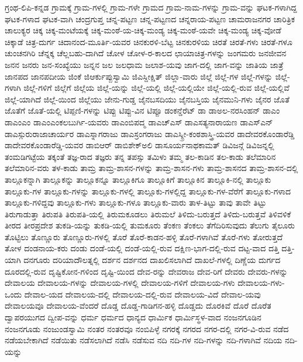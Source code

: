 {ಗ್ರಂಥ-ಲಿಪಿ-ಕನ್ನಡ
ಗ್ರಾಮಕ್ಕೆ
ಗ್ರಾಮ-ಗಳಲ್ಲಿ
ಗ್ರಾಮ-ಗಳೇ
ಗ್ರಾಮದ
ಗ್ರಾಮ-ನಾಮ-ಗಳನ್ನು
ಗ್ರಾಮ-ವನ್ನು
ಘಟಕ-ಗಳಾಗಿದ್ದ
ಘಟಕ-ಗಳಾದ
ಘಟಕ-ವಾಗಿ
ಚಂದ್ರಗುಪ್ತ
ಚನ್ನ-ಪಟ್ಟಣ
ಚನ್ನ-ಪಟ್ಟಣದ
ಚನ್ನರಾಯ-ಪಟ್ಟಣ
ಚಾಮರಾಜನಗರ
ಚಾರಿತ್ರಿಕ
ಚಾಲುಕ್ಯರ
ಚಿಕ್ಕ
ಚಿಕ್ಕ-ಮಂಟೆಯಕ್ಕೆ
ಚಿಕ್ಕ-ಮಂಠೆ-ಯ-ಚಿಕ್ಕ-ಮಂಡ್ಯ
ಚಿಕ್ಕ-ಮಂಠೆ-ಯವೇ
ಚಿಕ್ಕ-ಮಂಡ್ಯ
ಚಿಕ್ಕ-ವೋಡೆ
ಚಿಕ್ಕಾಡೆ
ಚಿತ್ರ-ದುರ್ಗ
ಚಿದಾನಂದ-ಮೂರ್ತಿ-ಯವರ
ಚಿನಕುರಳಿ-ಬೆಟ್ಟ
ಚಿನಕುರಳಿಯ
ಚಿರತೆ
ಚಿರತೆ-ಗಳು
ಚಿರತೆ-ಗಳೂ
ಚುಂಚನಗಿರಿ
ಚೆನ್ನಕ್ಕ
ಚೆಲ್ಲಬಹು-ದಾಗಿದೆ
ಚೋಳ
ಚೋಳ-ರ-ಕಾಲದ
ಛಾಯಾಚಿತ್ರ-ಗಳನ್ನು
ಜಂಗಮರು
ಜನಜೀವನ
ಜನನ
ಜನರು
ಜನ-ಸಂಖ್ಯೆಯು
ಜನ್ನನ
ಜಲ
ಜಲಧಾಮ
ಜಲಾಶ-ಯವು
ಜಾಗ-ದಲ್ಲಿ
ಜಾಗ-ವನ್ನು
ಜಾತಿಯ
ಜಾತ್ರೆ
ಜಾನಪದ
ಜಾನಪದೀಯ
ಜಿಂಕೆ
ಜಿಆರ್ಕುಪ್ಪುಸ್ವಾಮಿ
ಜಿಎಸ್ದೀಕ್ಷಿತ್
ಜಿಲ್ಲಾ-ವಾರು
ಜಿಲ್ಲೆ
ಜಿಲ್ಲೆ-ಗಳ
ಜಿಲ್ಲೆ-ಗಳನ್ನು
ಜಿಲ್ಲೆ-ಗಳಾಗಿ
ಜಿಲ್ಲೆ-ಗಳಿಗೆ
ಜಿಲ್ಲೆಗೆ
ಜಿಲ್ಲೆಯ
ಜಿಲ್ಲೆ-ಯನ್ನು
ಜಿಲ್ಲೆ-ಯಲ್ಲಿ
ಜಿಲ್ಲೆ-ಯಲ್ಲಿಯೇ
ಜಿಲ್ಲೆ-ಯಲ್ಲಿ-ರುವ
ಜಿಲ್ಲೆ-ಯಲ್ಲಿವೆ
ಜಿಲ್ಲೆ-ಯಾಗಿದೆ
ಜಿಲ್ಲೆ-ಯಿಂದ
ಜಿಲ್ಲೆಯು
ಜೇನು-ಗುಡ್ಡ
ಜೈನಬಸದಿಯು
ಜೈನಬಸ್ತಿಯ
ಜೈನಮುನಿ-ಗಳು
ಜೈನರ
ಜೊತೆ
ಜೊತೆಗೆ
ಜೊತೆ-ಯಲ್ಲಿ
ಟಿಪ್ಪಣಿ-ಗಳನ್ನು
ಟಿಪ್ಪು
ಟಿಪ್ಪು-ವಿನ
ಟಿಪ್ಪೂ
ಡಂಕನ್ಡೆರೆಟ್
ಡಾ
ಡಾಅಲ-ನರಸಿಂಹನ್
ಡಾಎಂ
ಡಾಎಂಎಂ
ಡಾಎಂಎಂಕಲಬುರ್ಗಿ-ಯವರು
ಡಾಎಂಬಿಪದ್ಮ
ಡಾಎಚ್ಎಸ್
ಡಾಎಸತ್ಯನಾರಾಯಣ
ಡಾಎಸ್ಎನ್
ಡಾಎಸ್ಗುರುರಾಜಾಚಾರ್ಯರ
ಡಾಎಸ್ನಾಗರಾಜು
ಡಾಎಸ್ರಂಗರಾಜು
ಡಾಎಸ್ಶ್ರೀ-ಕಂಠಶಾಸ್ತ್ರಿ-ಯವರ
ಡಾದೇವರಕೊಂಡಾರೆಡ್ಡಿ
ಡಾದೇವರಕೊಂಡಾರೆಡ್ಡಿ-ಯವರ
ಡಾಬಿಆರ್
ಡಾಬಿಶೇಕ್ಅಲಿ
ಡಾಸೂರ್ಯನಾಥಕಾಮತ್
ಡಿವಿಜನ್ಗೆ
ಡಿವಿಜನ್ನಲ್ಲಿ
ತಂಮಡಿಗಟ್ಟೆಯ
ತಕ್ಕಂತೆ
ತಜ್ಞ-ರಾದ
ತಜ್ಞರು
ತನ್ನ
ತಪಸ್ಸು
ತಮಿಳು
ತಮ್ಮ
ತಲ-ಕಾಡಿನ
ತಲ-ಕಾಡು
ತಲೆಮಾರಿನ
ತಲೆಮಾರಿನ-ವರು
ತಳ-ಕಾಡು
ತಾಮ್ರ
ತಾಮ್ರ-ಶಾಸನ-ಗಳನ್ನು
ತಾಮ್ರ-ಶಾಸನ-ಗಳು
ತಾಮ್ರ-ಶಾಸನದ
ತಾಮ್ರ-ಶಾಸನ-ದಲ್ಲಿ
ತಾಲ್ಲೂಕನ್ನಾಗಿ
ತಾಲ್ಲೂಕನ್ನು
ತಾಲ್ಲೂಕನ್ನೂ
ತಾಲ್ಲೂಕಿಗೂ
ತಾಲ್ಲೂಕಿಗೆ
ತಾಲ್ಲೂಕಿನ
ತಾಲ್ಲೂಕಿ-ನಲ್ಲಿ
ತಾಲ್ಲೂಕು
ತಾಲ್ಲೂಕು-ಗಳ
ತಾಲ್ಲೂಕು-ಗಳನ್ನು
ತಾಲ್ಲೂಕು-ಗಳಲ್ಲಿ
ತಾಲ್ಲೂಕು-ಗಳಲ್ಲಿದ್ದ
ತಾಲ್ಲೂಕು-ಗಳ-ವೆರೆಗೆ
ತಾಲ್ಲೂಕು-ಗಳಾದ
ತಾಲ್ಲೂಕು-ಗಳಿದ್ದವು
ತಾಲ್ಲೂಕು-ಗಳು
ತಾಲ್ಲೂಕು-ಗಳೂ
ತಾಲ್ಲೂಕು-ವಾರು
ತಾಳ-ತಿಟ್ಟು
ತಾವು
ತಾವೇ
ತಿಟ್ಟು
ತಿರುಗಾಡುತ್ತಾ
ತಿರುಪತಿ
ತಿರುಪತಿ-ಯಲ್ಲಿ
ತಿರುಮಕೂಡಲು
ತಿರುಮಲೆ
ತಿಳಿದು-ಬರುತ್ತದೆ
ತಿಳಿದು-ಬರುತ್ತವೆ
ತಿಳಿವಳಿಕೆ
ತೀರದ
ತೀರಪ್ರದೇಶ
ತುಕಡಿ-ಯನ್ನು
ತುಕಡಿ-ಯಲ್ಲಿ
ತುಮಕೂರು
ತೆಂಕಣ
ತೆಂಕಲು
ತೆಗೆದಿರಿಸುವುದು
ತೆಲುಗು
ತೈಲೂರು
ತೊಟ್ಟಿಲು
ತೊಣ್ಣೂರು
ತೊಣ್ಣೂರು-ಗಳಲ್ಲಿ
ತೊರೆ
ತೊರೆ-ಕಾಡನ-ಹಳ್ಳಿ
ತೊರೆ-ಗಳಾಗಿವೆ
ತೊರೆ-ಗಳು
ತೋರುತ್ತದೆ
ತೋಳ
ದಂಡನಾಯ-ಕರು
ದಂಡು
ದಂಡೆ-ಯಲ್ಲಿ
ದಂಡೆ-ಯಲ್ಲಿ-ರುವ
ದಕ್ಷಿಣ-ಭಾಗ-ದಲ್ಲಿ-ರುವ
ದಟ್ಟ-ವಾದ
ದತ್ತಿ
ದತ್ತಿ-ಯಾಗಿ
ದನಗೂರು
ದರಿಯಾದೌಲತ್ನಲ್ಲಿ
ದರ್ಶನ
ದರ್ಶನದ
ದಾಖಲಿಸಲಾಗಿದೆ
ದಾಖಲೆ-ಗಳಲ್ಲಿ
ದಿಣ್ಣೆಯ
ದುರ್ಗದ
ದೂರದಲ್ಲಿ-ರುವ
ದೃಷ್ಟಿಕೋನ-ಗಳಿಂದ
ದೃಷ್ಟಿ-ಯಿಂದ
ದೇವ-ರನ್ನು
ದೇವರಾಜ
ದೇವ-ರಿಗೆ
ದೇವರು
ದೇವರು-ಗಳನ್ನು
ದೇವಾಲಯ
ದೇವಾಲಯ-ಗಳನ್ನು
ದೇವಾಲಯ-ಗಳಲ್ಲಿ
ದೇವಾಲಯ-ಗಳಿಗೆ
ದೇವಾಲಯ-ಗಳು
ದೇವಾಲಯ-ಗಳು-ಒಂದು
ದೇವಾಲ-ಯದ
ದೇವಾಲಯ-ದಲ್ಲಿ
ದೇವಾಲಯ-ದಲ್ಲಿ-ರುವ
ದೇವಾಲಯ-ವಿದೆ
ದೇವಾಲ-ಯವು
ದೇವಾಲಯವೂ
ದೇವಾಲಯ-ವೆಂದರೆ
ದೊಡ್ಡ
ದೊಡ್ಡ-ಗಾಡಿಗನ-ಹಳ್ಳಿ
ದೊಡ್ಡದು
ದೊರಕಿವೆ
ದೊರೆ
ದೊರೆತ
ದ್ವಾಪರಯುಗದ
ದ್ವೀಪ-ವನ್ನು
ಧರ್ಮ
ಧರ್ಮದ
ಧಾನ್ಯದ
ಧಾರ್ಮಿಕ
ಧಾರ್ಮಿಸ್ಥಳ-ವಾದ
ನಂಜನಗೂಡಿನ
ನಂಜನಗೂಡು
ನಂಜುಂಡಸ್ವಾಮಿ
ನಂತರ
ನಂತರವೂ
ನಂಬಿಪಿಳ್ಳೆ
ನಗರಕ್ಕೆ
ನಗರದ
ನಗರ-ದಲ್ಲಿ
ನಗರ-ವಿ-ರುವ
ನಡೆದ
ನಡೆಯಬೇಕಾಗಿದೆ
ನಡೆಯಿತು
ನಡೆಸಲಾಗಿದೆ
ನಡೆಸಿ
ನಡೆಸುವ
ನದಿ
ನದಿ-ಗಳ
ನದಿ-ಗಳನ್ನು
ನದಿ-ಗಳಾಗಿವೆ
ನದಿಯ
ನದಿ-ಯನ್ನು
}
